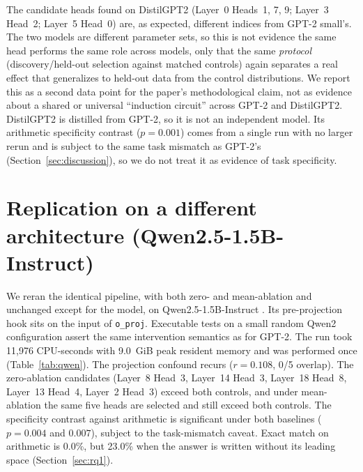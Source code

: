 \documentclass{article}
\begin{document}
The candidate heads found on DistilGPT2 (Layer~0 Heads~1, 7, 9;
Layer~3 Head~2; Layer~5 Head~0) are, as expected, different indices
from GPT-2 small's. The two models are different parameter sets, so
this is not evidence the same head performs the same role across
models, only that the same \emph{protocol} (discovery/held-out
selection against matched controls) again separates a real effect
that generalizes to held-out data from the control distributions. We report
this as a second data point for the paper's methodological claim, not
as evidence about a shared or universal ``induction circuit'' across
GPT-2 and DistilGPT2. DistilGPT2 is distilled from GPT-2, so it is not
an independent model. Its arithmetic specificity contrast ($p=0.001$)
comes from a single run with no larger rerun and is subject to the same
task mismatch as GPT-2's (Section~\ref{sec:discussion}), so we do not
treat it as evidence of task specificity.

\section{Replication on a different architecture (Qwen2.5-1.5B-Instruct)}
\label{app:qwen}

We reran the identical pipeline, with both zero- and mean-ablation and
unchanged except for the model, on Qwen2.5-1.5B-Instruct
\citep{qwen2025qwen25}. Its pre-projection hook sits on the input of
\texttt{o\_proj}. Executable tests on a small random Qwen2 configuration
assert the same intervention semantics as for GPT-2. The run took
11{,}976 CPU-seconds with 9.0~GiB peak resident memory and was performed
once (Table~\ref{tab:qwen}). The projection confound recurs ($r=0.108$,
0/5 overlap). The zero-ablation candidates (Layer~8 Head~3, Layer~14
Head~3, Layer~18 Head~8, Layer~13 Head~4, Layer~2 Head~3) exceed both
controls, and under mean-ablation the same five heads are selected and
still exceed both controls. The specificity contrast against arithmetic
is significant under both baselines ($p=0.004$ and $0.007$), subject to
the task-mismatch caveat. Exact match on arithmetic is 0.0\%, but 23.0\%
when the answer is written without its leading space
(Section~\ref{sec:rq1}).
\end{document}

